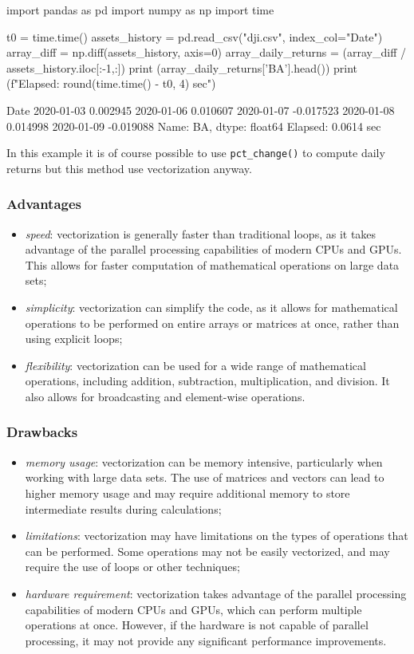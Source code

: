 \begin{ipython}
import pandas as pd
import numpy as np
import time

t0 = time.time()
assets_history = pd.read_csv("dji.csv", index_col="Date")
array_diff = np.diff(assets_history, axis=0)
array_daily_returns = (array_diff / assets_history.iloc[:-1,:])
print (array_daily_returns['BA'].head())
print (f"Elapsed: {round(time.time() - t0, 4)} sec")
\end{ipython}
\begin{ioutput}
Date
2020-01-03    0.002945
2020-01-06    0.010607
2020-01-07   -0.017523
2020-01-08    0.014998
2020-01-09   -0.019088
Name: BA, dtype: float64
Elapsed: 0.0614 sec
\end{ioutput}

In this example it is of course possible to use \texttt{pct\_change()} to compute daily returns but this method use vectorization anyway.

\subsubsection{Advantages}
\begin{itemize}
\item \emph{speed}: vectorization is generally faster than traditional loops, as it takes advantage of the parallel processing capabilities of modern CPUs and GPUs. This allows for faster computation of mathematical operations on large data sets;
\item \emph{simplicity}: vectorization can simplify the code, as it allows for mathematical operations to be performed on entire arrays or matrices at once, rather than using explicit loops;
\item \emph{flexibility}: vectorization can be used for a wide range of mathematical operations, including addition, subtraction, multiplication, and division. It also allows for broadcasting and element-wise operations.
\end{itemize}

\subsubsection{Drawbacks}
\begin{itemize}
\item \emph{memory usage}: vectorization can be memory intensive, particularly when working with large data sets. The use of matrices and vectors can lead to higher memory usage and may require additional memory to store intermediate results during calculations;
\item \emph{limitations}: vectorization may have limitations on the types of operations that can be performed. Some operations may not be easily vectorized, and may require the use of loops or other techniques;
\item \emph{hardware requirement}: vectorization takes advantage of the parallel processing capabilities of modern CPUs and GPUs, which can perform multiple operations at once. However, if the hardware is not capable of parallel processing, it may not provide any significant performance improvements.
\end{itemize}

